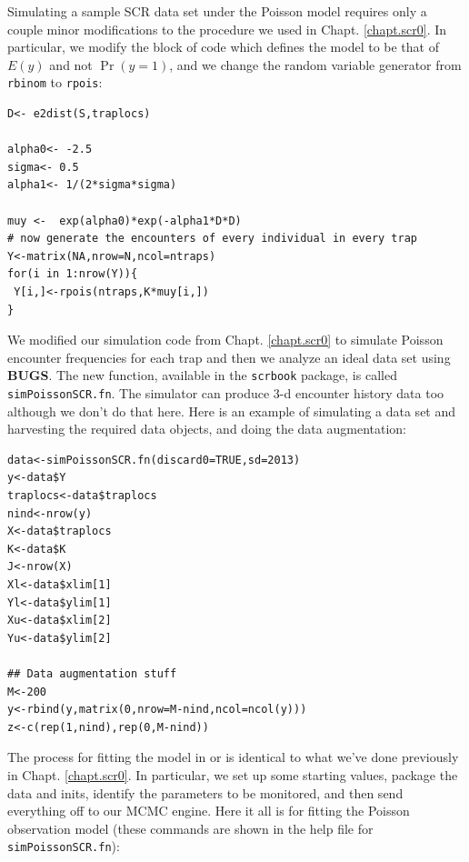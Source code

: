 Simulating a sample SCR data set under the Poisson model requires only
a couple minor modifications to the procedure we used in
Chapt. \ref{chapt.scr0}. In
particular, we modify the block of code which defines the model to be
that of $E(y)$ and not $\Pr(y=1)$, and we change the random variable
generator from \mbox{\tt rbinom} to \mbox{\tt rpois}:
{\small
\begin{verbatim}
D<- e2dist(S,traplocs)

alpha0<- -2.5
sigma<- 0.5
alpha1<- 1/(2*sigma*sigma)

muy <-  exp(alpha0)*exp(-alpha1*D*D)
# now generate the encounters of every individual in every trap
Y<-matrix(NA,nrow=N,ncol=ntraps)
for(i in 1:nrow(Y)){
 Y[i,]<-rpois(ntraps,K*muy[i,])
}
\end{verbatim}
}

We modified our simulation code from Chapt. \ref{chapt.scr0} to
simulate Poisson encounter frequencies for each trap and then we
analyze an ideal data set using {\bf BUGS}. The new function,
available in the \mbox{\tt scrbook} package, is called {\tt
  simPoissonSCR.fn}.  The simulator can produce 3-d encounter history
data too although we don't do that here.  Here is an example of
simulating a data set and harvesting the required data objects, and
doing the data augmentation:

{\small
\begin{verbatim}
data<-simPoissonSCR.fn(discard0=TRUE,sd=2013)
y<-data$Y
traplocs<-data$traplocs
nind<-nrow(y)
X<-data$traplocs
K<-data$K
J<-nrow(X)
Xl<-data$xlim[1]
Yl<-data$ylim[1]
Xu<-data$xlim[2]
Yu<-data$ylim[2]

## Data augmentation stuff
M<-200
y<-rbind(y,matrix(0,nrow=M-nind,ncol=ncol(y)))
z<-c(rep(1,nind),rep(0,M-nind))
\end{verbatim}
}

The process for fitting
the model in \winbugs  or \jags is identical to what we've done
previously in Chapt. \ref{chapt.scr0}. In particular, we set up some
starting values, package the data and inits, identify the parameters
to be monitored, and then send everything off to our MCMC engine. Here
it all is for fitting the Poisson observation model (these commands
are shown in the help file for \mbox{\tt simPoissonSCR.fn}):


